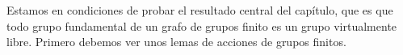 \documentclass[tesis.tex]{subfiles}
\begin{document}
%	


Estamos en condiciones de probar el resultado central del capítulo, que es que todo grupo fundamental de un grafo de grupos finito es un grupo virtualmente libre.
Primero debemos ver unos lemas de acciones de grupos finitos.


\end{document}
